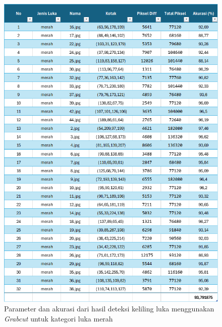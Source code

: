 \begin{figure}[H]
	\centering
	\includegraphics[width=1\textwidth]{gambar/result_table_merah.png}
	\caption{Parameter dan akurasi dari hasil deteksi keliling luka menggunakan \emph{Grabcut} untuk kategori luka merah}
	\label{img:result_merah}
\end{figure}




